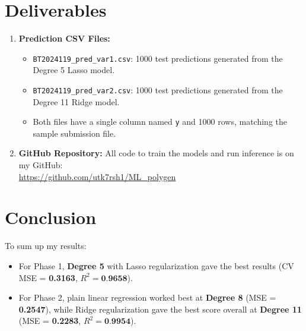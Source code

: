 \documentclass[11pt]{article}
\begin{document}
\section{Deliverables}
\begin{enumerate}\itemsep 0pt
    \item \textbf{Prediction CSV Files:}
    \begin{itemize}\itemsep 0pt
        \item \texttt{BT2024119\_pred\_var1.csv}: 1000 test predictions generated from the Degree 5 Lasso model.
        \item \texttt{BT2024119\_pred\_var2.csv}: 1000 test predictions generated from the Degree 11 Ridge model.
        \item Both files have a single column named \texttt{y} and 1000 rows, matching the sample submission file.
    \end{itemize}
    \item \textbf{GitHub Repository:}
    All code to train the models and run inference is on my GitHub: \\
    \url{https://github.com/utk7rsh1/ML_polygen}
\end{enumerate}

\section{Conclusion}
To sum up my results:
\begin{itemize}\itemsep 0pt
    \item For Phase 1, \textbf{Degree 5} with Lasso regularization gave the best results (CV MSE = \textbf{0.3163}, $R^2 = \textbf{0.9658}$).
    \item For Phase 2, plain linear regression worked best at \textbf{Degree 8} (MSE = \textbf{0.2547}), while Ridge regularization gave the best score overall at \textbf{Degree 11} (MSE = \textbf{0.2283}, $R^2 = \textbf{0.9954}$).
\end{itemize}
\end{document}
